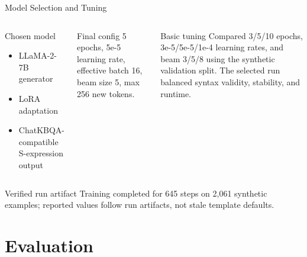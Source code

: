 \begin{frame}[shrink=12]{Model Selection and Tuning}
  \begin{columns}[T]
    \begin{block}{Chosen model}
      \small
      \begin{itemize}
        \item LLaMA-2-7B generator~\parencite{touvron2023llama}
        \item LoRA adaptation~\parencite{hu2022lora}
        \item ChatKBQA-compatible S-expression output
      \end{itemize}
    \end{block}
    \begin{block}{Final config}
      \small 5 epochs, 5e-5 learning rate, effective batch 16, beam size 5, max 256 new tokens.
    \end{block}
    \begin{exampleblock}{Basic tuning}
      \small
      Compared 3/5/10 epochs, 3e-5/5e-5/1e-4 learning rates, and beam 3/5/8 using the synthetic validation split. The selected run balanced syntax validity, stability, and runtime.
    \end{exampleblock}
  \end{columns}
  \vspace{0.1cm}
  \begin{alertblock}{Verified run artifact}
    Training completed for 645 steps on 2,061 synthetic examples; reported values follow run artifacts, not stale template defaults.
  \end{alertblock}
\end{frame}

\section{Evaluation}

